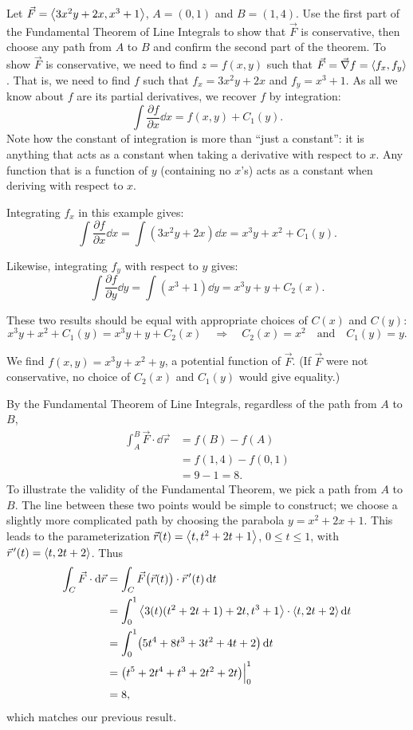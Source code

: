 \begin{example}\label{ex_livf5}%
Let $\vec F =\left\langle 3x^2y+2x, x^3+1\right\rangle$, $A = (0,1)$ and $B = (1,4)$. Use the first part of the Fundamental Theorem of Line Integrals to show that $\vec F$ is conservative, then choose any path from $A$ to $B$ and confirm the second part of the theorem.
\solution
To show $\vec F$ is conservative, we need to find $z = f(x,y)$ such that $\vec F = \vec\nabla f =\left\langle f_x, f_y\right\rangle$. That is, we need to find $f$ such that $f_x = 3x^2y+2x$ and $f_y = x^3+1$. As all we know about $f$ are its partial derivatives, we recover $f$ by integration:
\[\int \frac{\partial f}{\partial x}\dd x = f(x,y) + C_1(y).\]
Note how the constant of integration is more than ``just a constant'': it is anything that acts as a constant when taking a derivative with respect to $x$. Any function that is a function of $y$ (containing no $x$'s) acts as a constant when deriving with respect to $x$.

Integrating $f_x$ in this example gives:
\[\int \frac{\partial f}{\partial x}\dd x = \int (3x^2y+2x)\dd x = x^3y+x^2 + C_1(y).\]

Likewise, integrating $f_y$ with respect to $y$ gives:
\[\int \frac{\partial f}{\partial y}\dd y = \int( x^3+1)\dd y = x^3y+ y + C_2(x).\]

These two results should be equal with appropriate choices of $C(x)$ and $C(y)$:
\[
x^3y+x^2 + C_1(y) = x^3y+ y + C_2(x)
\quad \Rightarrow\quad
C_2(x) = x^2 \quad \text{and}\quad C_1(y) = y.
\]

We find $f(x,y) = x^3y+x^2+y$, a potential function of $\vec F$. (If $\vec F$ were not conservative, no choice of $C_2(x)$ and $C_1(y)$ would give equality.)

By the Fundamental Theorem of Line Integrals, regardless of the path from $A$ to $B$, 
\begin{align*}
	\int_A^B\vec F\cdot\dd\vec r
	&= f(B) - f(A) \\
	&= f(1,4) - f(0,1) \\
	&= 9 - 1 = 8.
\end{align*}
To illustrate the validity of the Fundamental Theorem, we pick a path from $A$ to $B$. The line between these two points would be simple to construct; we choose a slightly more complicated path by choosing the parabola $y = x^2+2x+1$. This leads to the parameterization $\vec r(t) =\left\langle t, t^2+2t+1\right\rangle$, $0\leq t\leq 1$, with $\vec r\hskip1.25pt '(t) =\left\langle t, 2t+2\right\rangle$. Thus
\begin{align*}
	\int_C \vec F\cdot\operatorname{d}\!\vec r &= \int_C\vec F\bigl(\vec r(t)\bigr)\cdot\vec r\hskip1.25pt '(t)\operatorname{d}\! t\\
	&= \int_0^1\left\langle 3(t)(t^2+2t+1)+2t, t^3+1\right\rangle\cdot\left\langle t,2t+2\right\rangle\operatorname{d}\! t\\
	&= \int_0^1 \bigl(5t^4+8t^3+3t^2+4t+2\bigr)\operatorname{d}\! t\\
	&= \bigl(t^5+2t^4+t^3+2t^2+2t\bigr)\Big|_0^1\\
	&= 8,
\end{align*}
which matches our previous result.
\end{example}

